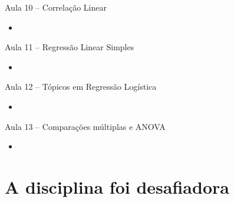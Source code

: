 \documentclass{beamer}
\begin{document}
\begin{frame}{\scriptsize Aula 10 -- Correlação Linear}
  \begin{itemize}
  \item 
  \end{itemize}
\end{frame}

\begin{frame}{\scriptsize Aula 11 -- Regressão Linear Simples}
  \begin{itemize}
  \item 
  \end{itemize}
\end{frame}

\begin{frame}{\scriptsize Aula 12 -- Tópicos em Regressão Logística}
  \begin{itemize}
  \item 
  \end{itemize}
\end{frame}

\begin{frame}{\scriptsize Aula 13 -- Comparações múltiplas e ANOVA}
  \begin{itemize}
  \item 
  \end{itemize}
\end{frame}

\section{A disciplina foi desafiadora}
\end{document}
